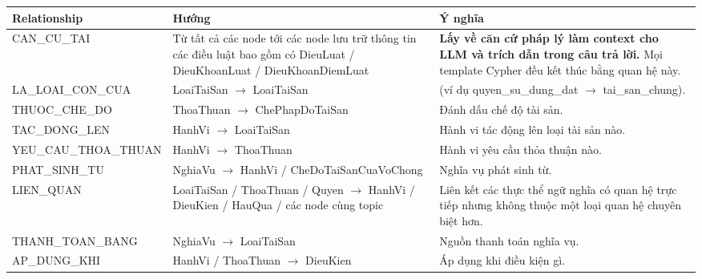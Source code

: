 \documentclass[../DoAn.tex]{subfiles}
\begin{document}
\begin{table}[htbp]
\centering
\footnotesize
\renewcommand{\arraystretch}{1.15}
\begin{tabularx}{\textwidth}{|>{\raggedright\arraybackslash}p{2.6cm}|>{\raggedright\arraybackslash}p{2.8cm}|>{\raggedright\arraybackslash}X|}
\hline
\textbf{Relationship} & \textbf{Hướng} & \textbf{Ý nghĩa} \\ \hline

CAN\_\allowbreak CU\_\allowbreak TAI &
Từ tất cả các node tới các node lưu trữ thông tin các điều luật bao gồm có DieuLuat / DieuKhoanLuat / DieuKhoan\-DiemLuat &
\textbf{Lấy về căn cứ pháp lý làm context cho LLM và trích dẫn trong câu trả lời.} Mọi template Cypher đều kết thúc bằng quan hệ này. \\ \hline

LA\_\allowbreak LOAI\_\allowbreak CON\_\allowbreak CUA &
LoaiTaiSan $\rightarrow$ LoaiTaiSan &
(ví dụ quyen\_su\_dung\_dat $\rightarrow$ tai\_san\_chung). \\ \hline

THUOC\_\allowbreak CHE\_\allowbreak DO &
ThoaThuan $\rightarrow$ ChePhapDo\-TaiSan &
Đánh dấu chế độ tài sản. \\ \hline

TAC\_\allowbreak DONG\_\allowbreak LEN &
HanhVi $\rightarrow$ LoaiTaiSan &
Hành vi tác động lên loại tài sản nào. \\ \hline

YEU\_\allowbreak CAU\_\allowbreak THOA\_\allowbreak THUAN &
HanhVi $\rightarrow$ ThoaThuan &
Hành vi yêu cầu thỏa thuận nào. \\ \hline

PHAT\_\allowbreak SINH\_\allowbreak TU &
NghiaVu $\rightarrow$ HanhVi / CheDoTai\-SanCuaVo\-Chong &
Nghĩa vụ phát sinh từ. \\ \hline

LIEN\_QUAN &
LoaiTaiSan / ThoaThuan / Quyen $\rightarrow$ \newline HanhVi / DieuKien / HauQua / các node cùng topic &
Liên kết các thực thể ngữ nghĩa có quan hệ trực tiếp nhưng không thuộc một loại quan hệ chuyên biệt hơn. \\ \hline

THANH\_\allowbreak TOAN\_\allowbreak BANG &
NghiaVu $\rightarrow$ LoaiTaiSan &
Nguồn thanh toán nghĩa vụ. \\ \hline

AP\_\allowbreak DUNG\_\allowbreak KHI &
HanhVi / ThoaThuan $\rightarrow$ DieuKien &
Áp dụng khi điều kiện gì. \\ \hline


\end{tabularx}
\end{table}
\end{document}
